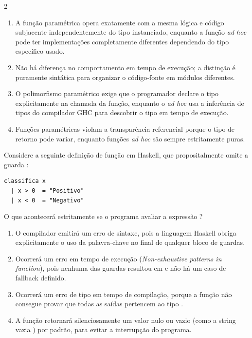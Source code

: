 \documentclass[a4paper,10pt,brazil]{article}
\begin{document}
\begin{multicols}{2}
\begin{enumerate}
  \item A função paramétrica opera exatamente com a mesma lógica e código subjacente independentemente do tipo instanciado, enquanto a função \emph{ad hoc} pode ter implementações completamente diferentes dependendo do tipo específico usado.

  \item Não há diferença no comportamento em tempo de execução; a distinção é puramente sintática para organizar o código-fonte em módulos diferentes.

  \item O polimorfismo paramétrico exige que o programador declare o tipo explicitamente na chamada da função, enquanto o \emph{ad hoc} usa a inferência de tipos do compilador GHC para descobrir o tipo em tempo de execução.

  \item Funções paramétricas violam a transparência referencial porque o tipo de retorno pode variar, enquanto funções \emph{ad hoc} são sempre estritamente puras.


\end{enumerate}

Considere a seguinte definição de função em Haskell, que propositalmente omite a guarda :

\begin{verbatim}
classifica x
  | x > 0  = "Positivo"
  | x < 0  = "Negativo"
\end{verbatim}

O que acontecerá estritamente se o programa avaliar a expressão ?

\begin{enumerate}
  \item O compilador emitirá um erro de sintaxe, pois a linguagem Haskell obriga explicitamente o uso da palavra-chave  no final de qualquer bloco de guardas.

  \item Ocorrerá um erro em tempo de execução (\emph{Non-exhaustive patterns in function}), pois nenhuma das guardas resultou em  e não há um caso de fallback definido.

  \item Ocorrerá um erro de tipo em tempo de compilação, porque a função não consegue provar que todas as saídas pertencem ao tipo .

  \item A função retornará silenciosamente um valor nulo ou vazio (como a string vazia ) por padrão, para evitar a interrupção do programa.


\end{enumerate}
\end{multicols}
\end{document}
